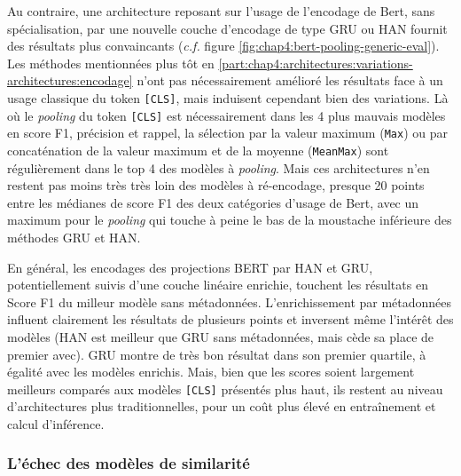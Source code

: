 Au contraire, une architecture reposant sur l'usage de l'encodage de Bert, sans spécialisation, par une nouvelle couche d'encodage de type GRU ou HAN fournit des résultats plus convaincants (\textit{c.f.} figure \ref{fig:chap4:bert-pooling-generic-eval}). Les méthodes mentionnées plus tôt en \ref{part:chap4:architectures:variations-architectures:encodage} n'ont pas nécessairement amélioré les résultats face à un usage classique du token \texttt{[CLS]}, mais induisent cependant bien des variations. Là où le \textit{pooling} du token \texttt{[CLS]} est nécessairement dans les 4 plus mauvais modèles en score F1, précision et rappel, la sélection par la valeur maximum (\texttt{Max}) ou par concaténation de la valeur maximum et de la moyenne (\texttt{MeanMax}) sont régulièrement dans le top 4 des modèles à \textit{pooling}. Mais ces architectures n'en restent pas moins très très loin des modèles à ré-encodage, presque 20 points entre les médianes de score F1 des deux catégories d'usage de Bert, avec un maximum pour le \textit{pooling} qui touche à peine le bas de la moustache inférieure des méthodes GRU et HAN.

En général, les encodages des projections BERT par HAN et GRU, potentiellement suivis d'une couche linéaire enrichie, touchent les résultats en Score F1 du milleur modèle sans métadonnées. L'enrichissement par métadonnées influent clairement les résultats de plusieurs points et inversent même l'intérêt des modèles (HAN est meilleur que GRU sans métadonnées, mais cède sa place de premier avec). GRU montre de très bon résultat dans son premier quartile, à égalité avec les modèles enrichis. Mais, bien que les scores soient largement meilleurs comparés aux modèles \texttt{[CLS]} présentés plus haut, ils restent au niveau d'architectures plus traditionnelles, pour un coût plus élevé en entraînement et calcul d'inférence.

\subsubsection{L’échec des modèles de similarité}

